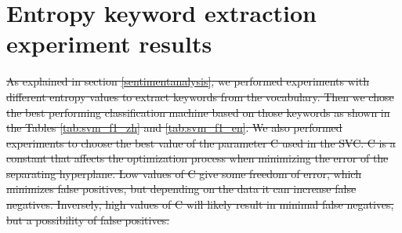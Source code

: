 \documentclass[smallextended,natbib]{svjour3}       %
\providecommand{\DIFdel}[1]{{\protect\color{red}\sout{#1}}}                      %
\begin{document}

\section{Entropy keyword extraction experiment results}%

\DIFdel{As explained in section \ref{sentimentanalysis}, we performed experiments with different entropy values to extract keywords from the vocabulary. Then we chose the best performing classification machine based on those keywords as shown in the Tables \ref{tab:svm_f1_zh} and \ref{tab:svm_f1_en}. We also performed experiments to choose the best value of the parameter C used in the SVC. C is a constant that affects the optimization process when minimizing the error of the separating hyperplane. Low values of C give some freedom of error, which minimizes false positives, but depending on the data it can increase false negatives. Inversely, high values of C will likely result in minimal false negatives, but a possibility of false positives. 
}%
\end{document}
